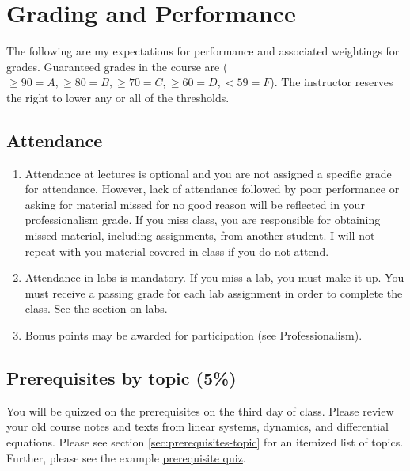 \documentclass[10pt]{article}
\begin{document}
\section{Grading and Performance}
The following are my expectations for performance and associated weightings for grades. Guaranteed grades in the course are ($\geq 90 = A,\geq 80 = B, \geq 70 = C, \geq 60 = D, < 59 = F$). The instructor reserves the right to lower any or all of the thresholds. 


\subsection{Attendance}
\begin{enumerate}
\item Attendance at lectures is optional and you are not assigned a specific grade for attendance. However, lack of attendance followed by poor performance or asking for material missed for no good reason will be reflected in your professionalism grade. If you miss class, you are responsible for obtaining missed material, including assignments, from another student. I will not repeat with you material covered in class if you do not attend.

\item Attendance in labs is mandatory.  If you miss a lab, you must make it up.  You must receive a passing grade for each lab assignment in order to complete the class.  See the section on labs.
\item Bonus points may be awarded for participation (see Professionalism).
\end{enumerate}

\subsection{Prerequisites by topic (5\%)}
\label{prerequisitetopics}
You will be quizzed on the prerequisites  on the third day of class.  Please review your old course notes and texts from linear systems, dynamics, and differential equations. Please see section \ref{sec:prerequisites-topic} for an itemized list of topics. Further, please see the example \href{http://www.cs.wright.edu/~jslater/materials/ME460TopicExam.pdf}{prerequisite quiz}.
\end{document}
